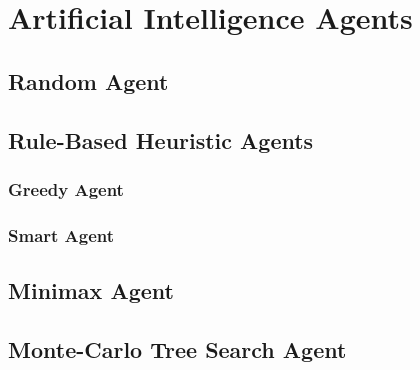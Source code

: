 \chapter{Artificial Intelligence Agents}

\section{Random Agent}

\section{Rule-Based Heuristic Agents}

\subsection{Greedy Agent}

\subsection{Smart Agent}

\section{Minimax Agent}

\section{Monte-Carlo Tree Search Agent}

